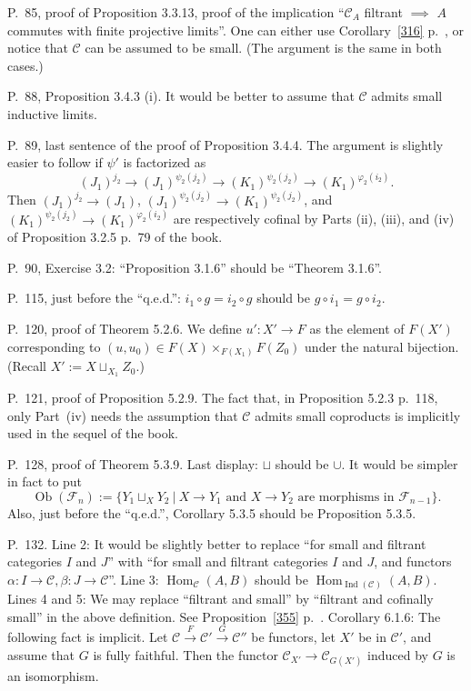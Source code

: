 \documentclass[12pt]{article}
\theoremstyle{remark}
\theoremstyle{definition}
\newcommand{\C}{\mathcal C}
\newcommand{\F}{\mathcal F}
\DeclareMathOperator{\Hom}{Hom}%
\DeclareMathOperator{\Ind}{Ind}
\DeclareMathOperator{\Ob}{Ob}
\begin{document}
\noindent P.~85, proof of Proposition 3.3.13, proof of the implication ``$\C_A$ filtrant $\implies$ $A$ commutes with finite projective limits''. One can either use Corollary~\ref{316} p.~\pageref{316}, or notice that $\C$ can be assumed to be small. (The argument is the same in both cases.)

\noindent P.~88, Proposition 3.4.3 (i). It would be better to assume that $\C$ admits small inductive limits.

\noindent P.~89, last sentence of the proof of Proposition 3.4.4. The argument is slightly easier to follow if $\psi'$ is factorized as 
$$
(J_1)^{j_2}\to(J_1)^{\psi_2(j_2)}\to(K_1)^{\psi_2(j_2)}\to(K_1)^{\varphi_2(i_2)}.
$$ 
Then $(J_1)^{j_2}\to(J_1)$, $(J_1)^{\psi_2(j_2)}\to(K_1)^{\psi_2(j_2)}$, and $(K_1)^{\psi_2(j_2)}\to(K_1)^{\varphi_2(i_2)}$ are respectively cofinal by Parts (ii), (iii), and (iv) of Proposition 3.2.5 p.~79 of the book.

\noindent P.~90, Exercise 3.2: ``Proposition 3.1.6'' should be ``Theorem 3.1.6''.

\noindent P.~115, just before the ``q.e.d.'': $i_1\circ g=i_2\circ g$ should be $g\circ i_1=g\circ i_2$.

\noindent P.~120, proof of Theorem 5.2.6. We define $u':X'\to F$ as the element of $F(X')$ corresponding to $(u,u_0)\in F(X)\times_{F(X_1)}F(Z_0)$ under the natural bijection. (Recall $X':=X\sqcup_{X_1}Z_0$.)

\noindent P.~121, proof of Proposition 5.2.9. The fact that, in Proposition 5.2.3 p.~118, only Part~(iv) needs the assumption that $\C$ admits small coproducts is implicitly used in the sequel of the book.

\noindent P.~128, proof of Theorem 5.3.9. Last display: $\sqcup$ should be $\cup$. It would be simpler in fact to put 
$$
\Ob(\F_n):=\{Y_1\sqcup_XY_2\ |\ X\to Y_1\text{ and }X\to Y_2\text{ are morphisms in }\F_{n-1}\}.
$$ 
Also, just before the ``q.e.d.'', Corollary 5.3.5 should be Proposition 5.3.5. 

\noindent P.~132. Line 2: It would be slightly better to replace ``for small and filtrant categories $I$ and $J$'' with ``for small and filtrant categories $I$ and $J$, and functors $\alpha:I\to\C,\beta:J\to\C$''. Line 3: $\Hom_\C(A,B)$ should be $\Hom_{\Ind(\C)}(A,B)$. Lines 4 and 5: \guillemotleft We may replace ``filtrant and small'' by ``filtrant and cofinally small'' in the above definition\guillemotright. See Proposition~\ref{355} p.~\pageref{355}. Corollary 6.1.6: The following fact is implicit. Let $\C\xrightarrow{F}\C'\xrightarrow{G}\C''$ be functors, let $X'$ be in $\C'$, and assume that $G$ is fully faithful. Then the functor $\C_{X'}\to\C_{G(X')}$ induced by $G$ is an isomorphism.
\end{document}
